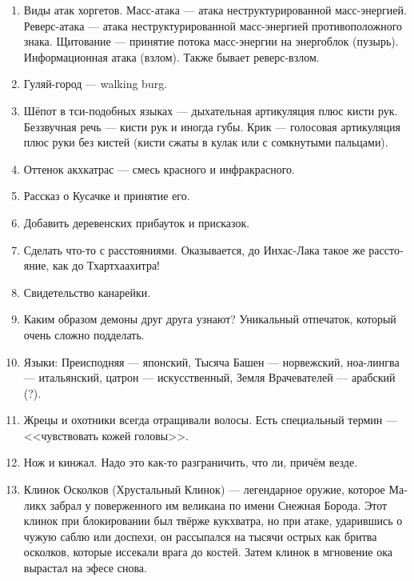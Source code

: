 \documentclass[a4paper,12pt,fleqn]{book}\usepackage{cooltooltips}\usepackage{polyglossia}\setdefaultlanguage[babelshorthands=true]{russian}\setotherlanguage{english}\defaultfontfeatures{Ligatures=TeX,Mapping=tex-text} \usepackage{xcolor}\definecolor{lightgray}{HTML}{bbbbbb}\color{lightgray}\newcommand{\ml}[3]{\textenglish{\textcolor{black}{#3}}}
\begin{document}
{\begin{enumerate}
\item Виды атак хоргетов.
Масс-атака --- атака неструктурированной масс-энергией.
Реверс-атака --- атака неструктурированной масс-энергией противоположного знака.
Щитование --- принятие потока масс-энергии на энергоблок (пузырь).
Информационная атака (взлом).
Также бывает реверс-взлом.

\item Гуляй-город --- walking burg.

\item Шёпот в тси-подобных языках --- дыхательная артикуляция плюс кисти рук.
Беззвучная речь --- кисти рук и иногда губы.
Крик --- голосовая артикуляция плюс руки без кистей (кисти сжаты в кулак или с сомкнутыми пальцами).

\item Оттенок акхкатрас --- смесь красного и инфракрасного.

\item Рассказ о Кусачке и принятие его.

\item Добавить деревенских прибауток и присказок.

\item Сделать что-то с расстояниями.
Оказывается, до Инхас-Лака такое же расстояние, как до Тхартхаахитра!

\item Свидетельство канарейки.

\item Каким образом демоны друг друга узнают?
Уникальный отпечаток, который очень сложно подделать.

\item Языки: Преисподняя --- японский, Тысяча Башен --- норвежский, ноа-лингва --- итальянский, цатрон --- искусственный, Земля Врачевателей --- арабский (?).

\item Жрецы и охотники всегда отращивали волосы.
Есть специальный термин --- <<чувствовать кожей головы>>.

\item Нож и кинжал.
Надо это как-то разграничить, что ли, причём везде.

\item Клинок Осколков (Хрустальный Клинок) --- легендарное оружие, которое Маликх забрал у поверженного им великана по имени Снежная Борода.
Этот клинок при блокировании был твёрже кукхватра, но при атаке, ударившись о чужую саблю или доспехи, он рассыпался на тысячи острых как бритва осколков, которые иссекали врага до костей.
Затем клинок в мгновение ока вырастал на эфесе снова.


\end{enumerate}}
\end{document}

